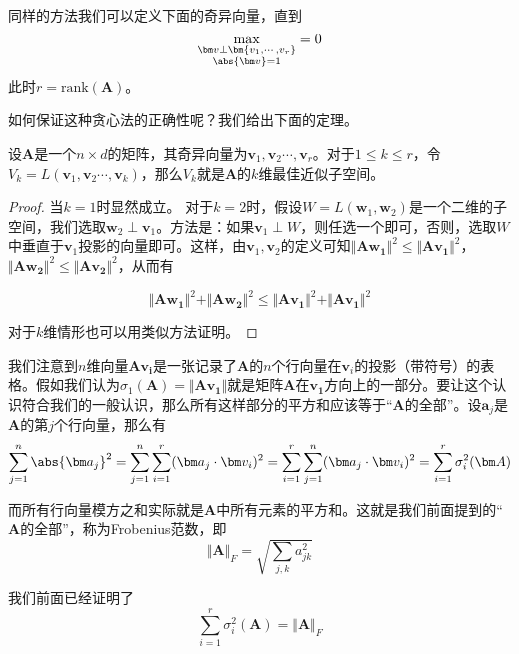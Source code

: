 \documentclass[UTF8]{ctexbook}
\newcommand{\Frobenius}[1]{\Vert #1 \Vert}
\begin{document}
同样的方法我们可以定义下面的奇异向量，直到
\begin{equation}
\max_{\substack{\bm v \perp \bm{v_1, \cdots, v_r}\\\abs{\bm v} = 1}} = 0
\end{equation}
此时$r = \text{rank}(\bm A)$。

如何保证这种贪心法的正确性呢？我们给出下面的定理。
\begin{thm}
	设$\bm A$是一个$n \times d$的矩阵，其奇异向量为$\bm v_1, \bm v_2 \cdots, \bm v_r$。对于$1 \le k \le r$，令$V_k = L(\bm v_1, \bm v_2 \cdots, \bm v_k)$，那么$V_k$就是$\bm A$的$k$维最佳近似子空间。
\end{thm}

\begin{proof}
	当$k = 1$时显然成立。
	对于$k = 2$时，假设$W = L(\bm w_1, \bm w_2)$是一个二维的子空间，我们选取$\bm w_2 \perp \bm v_1$。方法是：如果$\bm v_1 \perp W$，则任选一个即可，否则，选取$W$中垂直于$\bm v_1$投影的向量即可。这样，由$\bm v_1,\bm v_2$的定义可知$\Frobenius{\bm{Aw_1}}^2 \le \Frobenius{\bm{Av_1}}^2$，$\Frobenius{\bm{Aw_2}}^2 \le \Frobenius{\bm{Av_2}}^2$，从而有

	\begin{equation}
		\Frobenius{\bm{Aw_1}}^2 + \Frobenius{\bm{Aw_2}}^2 \le \Frobenius{\bm{Av_1}}^2 + \Frobenius{\bm{Av_1}}^2
	\end{equation}

	对于$k$维情形也可以用类似方法证明。
\end{proof}

	我们注意到$n$维向量$\bm{A v_i}$是一张记录了$\bm A$的$n$个行向量在$\bm v_i$的投影（带符号）的表格。假如我们认为$\sigma_1(\bm A) = \Frobenius{\bm{Av_1}}$就是矩阵$\bm A$在$\bm{v_1}$方向上的一部分。要让这个认识符合我们的一般认识，那么所有这样部分的平方和应该等于“$\bm A$的全部”。设$\bm a_j$是$\bm A$的第$j$个行向量，那么有
	\begin{equation}
		\sum_{j=1}^{n} \abs{\bm a_j}^2 = \sum_{j=1}^n \sum_{i=1}^{r} (\bm a_j \cdot \bm v_i)^2 = \sum_{i = 1}^{r} \sum_{j=1}^{n} (\bm a_j \cdot \bm v_i)^2 = \sum_{i=1}^r \sigma_i^2(\bm A)
	\end{equation}


	而所有行向量模方之和实际就是$\bm A$中所有元素的平方和。这就是我们前面提到的“$\bm A$的全部”，称为Frobenius范数，即
	\begin{equation}
		\Frobenius{\bm A}_F = \sqrt{\sum_{j, k} a_{jk}^2}
	\end{equation}


	我们前面已经证明了
	\begin{equation}
		\sum_{i=1}^r \sigma_i^2(\bm A) = \Frobenius{\bm A}_F
		\label{eq:FrobeniusAndSingular}
	\end{equation}
\end{document}
